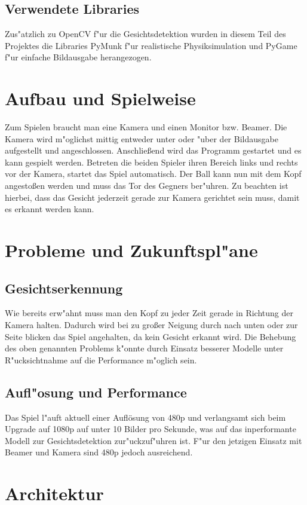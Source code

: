 \documentclass[12pt]{article}
\begin{document}
\subsection{Verwendete Libraries}
Zus"atzlich zu OpenCV f"ur die Gesichtsdetektion wurden in diesem Teil des Projektes
die Libraries PyMunk f"ur realistische Physiksimulation und PyGame f"ur einfache Bildausgabe
herangezogen.
\section{Aufbau und Spielweise}
Zum Spielen braucht man eine Kamera und einen Monitor bzw. Beamer. Die Kamera
wird m"oglichst mittig entweder unter oder "uber der Bildausgabe aufgestellt und angeschlossen.
Anschlie{\ss}end wird das Programm gestartet und es kann gespielt werden.
Betreten die beiden Spieler ihren Bereich links und rechts vor der Kamera,
startet das Spiel automatisch. Der Ball kann nun mit dem Kopf angesto{\ss}en werden
und muss das Tor des Gegners ber"uhren. Zu beachten ist hierbei, dass
das Gesicht jederzeit gerade zur Kamera gerichtet sein muss, damit es erkannt werden kann.
\section{Probleme und Zukunftspl"ane}
\subsection{Gesichtserkennung}
Wie bereits erw"ahnt muss man den Kopf zu jeder Zeit gerade in Richtung
der Kamera halten. Dadurch wird bei zu gro{\ss}er Neigung durch nach unten oder zur
Seite blicken das Spiel angehalten, da kein Gesicht erkannt wird.
Die Behebung des oben genannten Problems k"onnte durch Einsatz besserer
Modelle unter R"ucksichtnahme auf die Performance m"oglich sein.
\subsection{Aufl"osung und Performance}
Das Spiel l"auft aktuell einer Auflösung von 480p und verlangsamt sich beim Upgrade auf 1080p
auf unter 10 Bilder pro Sekunde, was auf das inperformante Modell zur
Gesichtsdetektion zur"uckzuf"uhren ist. F"ur den jetzigen Einsatz mit
Beamer und Kamera sind 480p jedoch ausreichend.
\section{Architektur}
\end{document}
